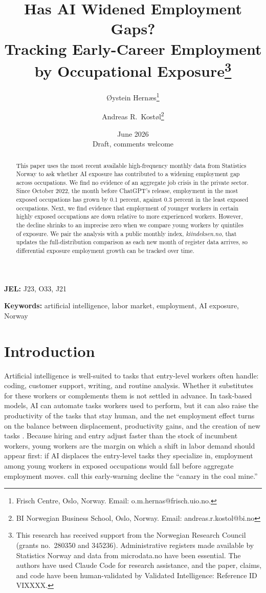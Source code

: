 \documentclass[12pt]{article}
\title{\textbf{Has AI Widened Employment Gaps?\\Tracking Early-Career Employment by Occupational Exposure}\thanks{This research has received support from the Norwegian Research Council (grants no.\ 280350 and  345236). Administrative registers made available by Statistics Norway and data from microdata.no have been essential. The authors have used Claude Code for research assistance, and the paper, claims, and code have been human-validated by Validated Intelligence: Reference ID VIXXXX. }}
\author{
  {\O}ystein Hern{\ae}s\thanks{Frisch Centre, Oslo, Norway. Email: o.m.hernas@frisch.uio.no.}
  \and
  Andreas R.\ Kost{\o}l\thanks{BI Norwegian Business School, Oslo, Norway. Email: andreas.r.kostol@bi.no}
}
\date{June 2026\\[6pt]\small Draft, comments welcome}
\begin{document}
\maketitle

\begin{abstract}
\noindent
This paper uses the most recent available high-frequency monthly data from Statistics Norway to ask whether AI exposure has contributed to a widening employment gap across occupations. We find no evidence of an aggregate job crisis in the private sector. Since October 2022, the month before ChatGPT's release, employment in the most exposed occupations has grown by 0.1 percent, against 0.3 percent in the least exposed occupations. Next, we find evidence that employment of younger workers in certain highly exposed occupations are down relative to more experienced workers. However, the decline shrinks to an imprecise zero when we compare young workers by quintiles of exposure. We pair the analysis with a public monthly index, \emph{kiindeksen.no}, that updates the full-distribution comparison as each new month of register data arrives, so differential exposure employment growth can be tracked over time.
\end{abstract}

\textbf{JEL:} J23, O33, J21

\textbf{Keywords:} artificial intelligence, labor market, employment, AI exposure, Norway

\clearpage
\setcounter{page}{1}


\section{Introduction}
\label{sec:introduction}

Artificial intelligence is well-suited to tasks that entry-level workers often handle: coding, customer support, writing, and routine analysis. Whether it substitutes for these workers or complements them is not settled in advance. In task-based models, AI can automate tasks workers used to perform, but it can also raise the productivity of the tasks that stay human, and the net employment effect turns on the balance between displacement, productivity gains, and the creation of new tasks \citep{acemoglu2025}. Because hiring and entry adjust faster than the stock of incumbent workers, young workers are the margin on which a shift in labor demand should appear first: if AI displaces the entry-level tasks they specialize in, employment among young workers in exposed occupations would fall before aggregate employment moves. \citet{brynjolfsson2025} call this early-warning decline the ``canary in the coal mine.'' 
\end{document}
